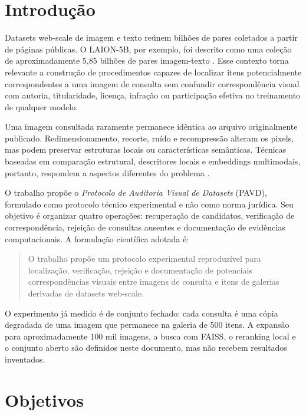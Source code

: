 \documentclass[12pt]{article}
\newcommand{\pavd}{PAVD}
\newcommand{\faiss}{FAISS}
\begin{document}
\section{Introdução}

Datasets web-scale de imagem e texto reúnem bilhões de pares coletados a partir
de páginas públicas. O LAION-5B, por exemplo, foi descrito como uma coleção de
aproximadamente 5,85 bilhões de pares imagem-texto \cite{schuhmann2022laion}.
Esse contexto torna relevante a construção de procedimentos capazes de
localizar itens potencialmente correspondentes a uma imagem de consulta sem
confundir correspondência visual com autoria, titularidade, licença, infração
ou participação efetiva no treinamento de qualquer modelo.

Uma imagem consultada raramente permanece idêntica ao arquivo originalmente
publicado. Redimensionamento, recorte, ruído e recompressão alteram os pixels,
mas podem preservar estruturas locais ou características semânticas. Técnicas
baseadas em comparação estrutural, descritores locais e embeddings
multimodais, portanto, respondem a aspectos diferentes do problema
\cite{wang2004ssim,lowe2004sift,radford2021clip}.

O trabalho propõe o \emph{Protocolo de Auditoria Visual de Datasets} (\pavd{}),
formulado como protocolo técnico experimental e não como norma jurídica. Seu
objetivo é organizar quatro operações: recuperação de candidatos,
verificação de correspondência, rejeição de consultas ausentes e
documentação de evidências computacionais. A formulação científica adotada é:

\begin{quote}
O trabalho propõe um protocolo experimental reproduzível para localização,
verificação, rejeição e documentação de potenciais correspondências visuais
entre imagens de consulta e itens de galerias derivadas de datasets
web-scale.
\end{quote}

O experimento já medido é de conjunto fechado: cada consulta é uma cópia
degradada de uma imagem que permanece na galeria de 500 itens. A expansão para
aproximadamente 100 mil imagens, a busca com \faiss{}, o reranking local e o
conjunto aberto são definidos neste documento, mas não recebem resultados
inventados.

\section{Objetivos}
\end{document}
